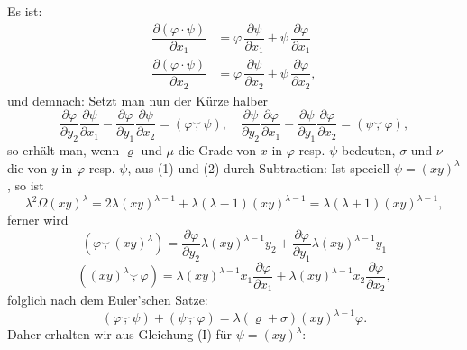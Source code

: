 Es ist:
\[ \begin{aligned} \dfrac{\partial(\varphi\cdot\psi)}{\partial x_1} &= \varphi\,\dfrac{\partial\psi}{\partial x_1} + \psi\,\dfrac{\partial\varphi}{\partial x_1} \\ \dfrac{\partial(\varphi\cdot\psi)}{\partial x_2} &= \varphi\,\dfrac{\partial\psi}{\partial x_2} + \psi\,\dfrac{\partial\varphi}{\partial x_2}, \end{aligned} \]
und demnach:
Setzt man nun der Kürze halber
\[ \dfrac{\partial\varphi}{\partial y_2}\dfrac{\partial\psi}{\partial x_1} - \dfrac{\partial\varphi}{\partial y_1}\dfrac{\partial\psi}{\partial x_2} = (\varphi\overset{\smile}{,}\psi), \quad \dfrac{\partial\psi}{\partial y_2}\dfrac{\partial\varphi}{\partial x_1} - \dfrac{\partial\psi}{\partial y_1}\dfrac{\partial\varphi}{\partial x_2} = (\psi\overset{\smile}{,}\varphi), \]
so erhält man, wenn $\varrho$ und $\mu$ die Grade von $x$ in $\varphi$ resp. $\psi$ bedeuten, $\sigma$ und $\nu$ die von $y$ in $\varphi$ resp. $\psi$, aus (1) und (2) durch Subtraction:
Ist speciell $\psi = (xy)^\lambda$, so ist
\[ \lambda^2\Omega(xy)^\lambda = 2\lambda(xy)^{\lambda-1} + \lambda(\lambda-1)(xy)^{\lambda-1} = \lambda(\lambda+1)(xy)^{\lambda-1}, \]
ferner wird
\[ (\varphi\overset{\smile}{,}(xy)^\lambda) = \dfrac{\partial\varphi}{\partial y_2}\lambda(xy)^{\lambda-1}y_2 + \dfrac{\partial\varphi}{\partial y_1}\lambda(xy)^{\lambda-1}y_1 \]
\[ ((xy)^\lambda\overset{\smile}{,}\varphi) = \lambda(xy)^{\lambda-1}x_1\dfrac{\partial\varphi}{\partial x_1} + \lambda(xy)^{\lambda-1}x_2\dfrac{\partial\varphi}{\partial x_2}, \]
folglich nach dem Euler'schen Satze:
\[ (\varphi\overset{\smile}{,}\psi) + (\psi\overset{\smile}{,}\varphi) = \lambda(\varrho+\sigma)(xy)^{\lambda-1}\varphi. \]
Daher erhalten wir aus Gleichung (I) für $\psi = (xy)^\lambda$:



